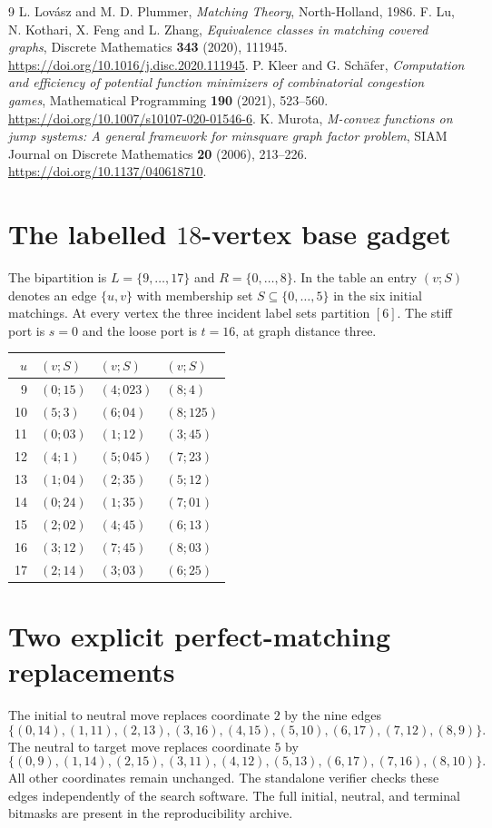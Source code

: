 \documentclass[11pt]{article}
\begin{document}
\begin{thebibliography}{9}
 L. Lov\'asz and M. D. Plummer, \emph{Matching Theory}, North-Holland, 1986.
 F. Lu, N. Kothari, X. Feng and L. Zhang, \emph{Equivalence classes in matching covered graphs}, Discrete Mathematics \textbf{343} (2020), 111945. \url{https://doi.org/10.1016/j.disc.2020.111945}.
 P. Kleer and G. Sch\"afer, \emph{Computation and efficiency of potential function minimizers of combinatorial congestion games}, Mathematical Programming \textbf{190} (2021), 523--560. \url{https://doi.org/10.1007/s10107-020-01546-6}.
 K. Murota, \emph{M-convex functions on jump systems: A general framework for minsquare graph factor problem}, SIAM Journal on Discrete Mathematics \textbf{20} (2006), 213--226. \url{https://doi.org/10.1137/040618710}.
\end{thebibliography}

\appendix
\section{The labelled $18$-vertex base gadget}\label{sec:base}
The bipartition is $L=\{9,\ldots,17\}$ and $R=\{0,\ldots,8\}$. In the table an entry $(v;S)$ denotes an edge $\{u,v\}$ with membership set $S\subseteq\{0,\ldots,5\}$ in the six initial matchings. At every vertex the three incident label sets partition $[6]$. The stiff port is $s=0$ and the loose port is $t=16$, at graph distance three.
\begin{center}\small
\begin{tabular}{rlll}\toprule
$u$ & $(v;S)$ & $(v;S)$ & $(v;S)$\\\midrule
9 & $(0;15)$ & $(4;023)$ & $(8;4)$\\
10 & $(5;3)$ & $(6;04)$ & $(8;125)$\\
11 & $(0;03)$ & $(1;12)$ & $(3;45)$\\
12 & $(4;1)$ & $(5;045)$ & $(7;23)$\\
13 & $(1;04)$ & $(2;35)$ & $(5;12)$\\
14 & $(0;24)$ & $(1;35)$ & $(7;01)$\\
15 & $(2;02)$ & $(4;45)$ & $(6;13)$\\
16 & $(3;12)$ & $(7;45)$ & $(8;03)$\\
17 & $(2;14)$ & $(3;03)$ & $(6;25)$\\\bottomrule
\end{tabular}
\end{center}

\section{Two explicit perfect-matching replacements}\label{sec:replacement}
The initial to neutral move replaces coordinate $2$ by the nine edges
\[
\{(0,14),(1,11),(2,13),(3,16),(4,15),(5,10),(6,17),(7,12),(8,9)\}.
\]
The neutral to target move replaces coordinate $5$ by
\[
\{(0,9),(1,14),(2,15),(3,11),(4,12),(5,13),(6,17),(7,16),(8,10)\}.
\]
All other coordinates remain unchanged. The standalone verifier checks these edges independently of the search software. The full initial, neutral, and terminal bitmasks are present in the reproducibility archive.
\end{document}
